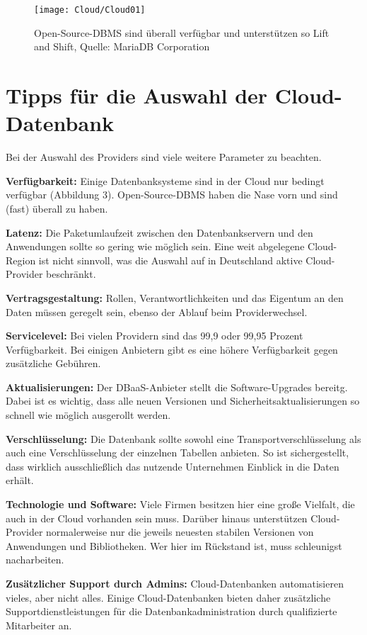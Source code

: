 \begin{figure}
	\texttt{[image: Cloud/Cloud01]}
	\caption[Open-Source-DBMS]{Open-Source-DBMS sind überall verfügbar und unterstützen so Lift and Shift, Quelle: MariaDB Corporation}
\end{figure}


\section{Tipps für die Auswahl der Cloud-Datenbank}

Bei der Auswahl des Providers sind viele weitere Parameter zu beachten.

\textbf{Verfügbarkeit:} Einige Datenbanksysteme sind in der Cloud nur bedingt verfügbar (Abbildung 3). Open-Source-DBMS haben die Nase vorn und sind (fast) überall zu haben.

\textbf{Latenz:} Die Paketumlaufzeit zwischen den Datenbankservern und den Anwendungen sollte so gering wie möglich sein. Eine weit abgelegene Cloud-Region ist nicht sinnvoll, was die Auswahl auf in Deutschland aktive Cloud-Provider beschränkt.

\textbf{Vertragsgestaltung:} Rollen, Verantwortlichkeiten und das Eigentum an den Daten müssen geregelt sein, ebenso der Ablauf beim Providerwechsel.

\textbf{Servicelevel:} Bei vielen Providern sind das 99,9 oder 99,95 Prozent Verfügbarkeit. Bei einigen Anbietern gibt es eine höhere Verfügbarkeit gegen zusätzliche Gebühren.

\textbf{Aktualisierungen:} Der DBaaS-Anbieter stellt die Software-Upgrades bereitg. Dabei ist es wichtig, dass alle neuen Versionen und Sicherheitsaktualisierungen so schnell wie möglich ausgerollt werden.

\textbf{Verschlüsselung:} Die Datenbank sollte sowohl eine Transportverschlüsselung als auch eine Verschlüsselung der einzelnen Tabellen anbieten. So ist sichergestellt, dass wirklich ausschließlich das nutzende Unternehmen Einblick in die Daten erhält.

\textbf{Technologie und Software:} Viele Firmen besitzen hier eine große Vielfalt, die auch in der Cloud vorhanden sein muss. Darüber hinaus unterstützen Cloud-Provider normalerweise nur die jeweils neuesten stabilen Versionen von Anwendungen und Bibliotheken. Wer hier im Rückstand ist, muss schleunigst nacharbeiten.

\textbf{Zusätzlicher Support durch Admins:} Cloud-Datenbanken automatisieren vieles, aber nicht alles. Einige Cloud-Datenbanken bieten daher zusätzliche Supportdienstleistungen für die Datenbankadministration durch qualifizierte Mitarbeiter an.

